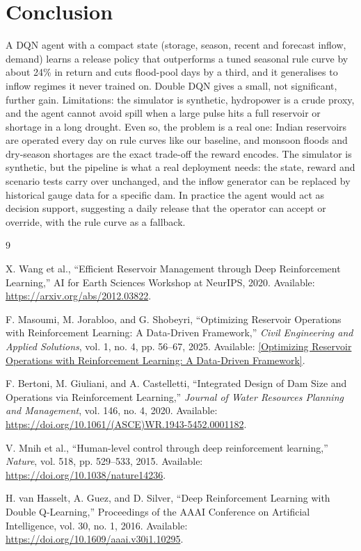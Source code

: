 \documentclass[10pt,twocolumn]{article}
\begin{document}
\section{Conclusion}
A DQN agent with a compact state (storage, season, recent and forecast inflow, demand) learns a release policy that outperforms a tuned seasonal rule curve by about 24\% in return and cuts flood-pool days by a third, and it generalises to inflow regimes it never trained on. Double DQN gives a small, not significant, further gain. Limitations: the simulator is synthetic, hydropower is a crude proxy, and the agent cannot avoid spill when a large pulse hits a full reservoir or shortage in a long drought. Even so, the problem is a real one: Indian reservoirs are operated every day on rule curves like our baseline, and monsoon floods and dry-season shortages are the exact trade-off the reward encodes. The simulator is synthetic, but the pipeline is what a real deployment needs: the state, reward and scenario tests carry over unchanged, and the inflow generator can be replaced by historical gauge data for a specific dam. In practice the agent would act as decision support, suggesting a daily release that the operator can accept or override, with the rule curve as a fallback.

\begin{thebibliography}{9}
\small

X. Wang et al.,
``Efficient Reservoir Management through Deep Reinforcement Learning,''
AI for Earth Sciences Workshop at NeurIPS, 2020.
Available: \url{https://arxiv.org/abs/2012.03822}.

F. Masoumi, M. Jorabloo, and G. Shobeyri,
``Optimizing Reservoir Operations with Reinforcement Learning:
A Data-Driven Framework,''
\textit{Civil Engineering and Applied Solutions},
vol. 1, no. 4, pp. 56--67, 2025.
Available: \href{https://www.magiran.com/paper/2894898/optimizing-reservoir-operations-with-reinforcement-learning-a-data-driven-framework?lang=en}{[Optimizing Reservoir Operations with Reinforcement Learning:
A Data-Driven Framework]}.

F. Bertoni, M. Giuliani, and A. Castelletti,
``Integrated Design of Dam Size and Operations via Reinforcement Learning,''
\textit{Journal of Water Resources Planning and Management},
vol. 146, no. 4, 2020.
Available: \url{https://doi.org/10.1061/(ASCE)WR.1943-5452.0001182}.

V. Mnih et al.,
``Human-level control through deep reinforcement learning,''
\textit{Nature}, vol. 518, pp. 529--533, 2015.
Available: \url{https://doi.org/10.1038/nature14236}.

H. van Hasselt, A. Guez, and D. Silver,
``Deep Reinforcement Learning with Double Q-Learning,''
Proceedings of the AAAI Conference on Artificial Intelligence,
vol. 30, no. 1, 2016.
Available: \url{https://doi.org/10.1609/aaai.v30i1.10295}.

\end{thebibliography}
\end{document}
